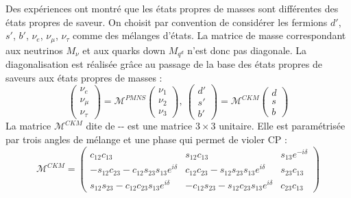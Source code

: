 Des expériences ont montré que les états propres de masses sont différentes des états propres de saveur. On choisit par convention de considérer les fermions $d'$, $s'$, $b'$, $\nu_{e}$, $\nu_{\mu}$, $\nu_{\tau}$ comme des mélanges d'états. La matrice de masse correspondant aux neutrinos $M_{\nu}$ et aux quarks down $M_{q^d}$ n'est donc pas diagonale. La diagonalisation est réalisée grâce au passage de la base des états propres de saveurs aux états propres de masses :
\begin{equation}
\begin{pmatrix} 
\nu_{e} \\ 
\nu_{\mu} \\ 
\nu_{\tau} 
\end{pmatrix}=\mathcal{M}^{PMNS}
\begin{pmatrix} 
\nu_{1}\\ 
\nu_{2}\\ 
\nu_{3}
\end{pmatrix},\ \begin{pmatrix} 
d' \\ 
s' \\ 
b' 
\end{pmatrix}=\mathcal{M}^{CKM}
\begin{pmatrix} 
d \\ 
s\\ 
b
\end{pmatrix}
\end{equation} 
La matrice $\mathcal{M}^{CKM}$ dite de -- est une matrice $3\times3$ unitaire. Elle est paramétrisée par trois angles de mélange et une phase qui permet de violer CP :
\begin{equation}
\mathcal{M}^{CKM}= 
\begin{pmatrix} 
c_{12}c_{13} & s_{12}c_{13} & s_{13}e^{-i\delta} \\
-s_{12}c_{23}-c_{12}s_{23}s_{13}e^{i\delta} & c_{12}c_{23}-s_{12}s_{23}s_{13}e^{i\delta} & s_{23}c_{13} \\
s_{12}s_{23}-c_{12}c_{23}s_{13}e^{i\delta} & -c_{12}s_{23}-s_{12}c_{23}s_{13}e^{i\delta} & c_{23}c_{13}
\end{pmatrix}
\end{equation} 
 

